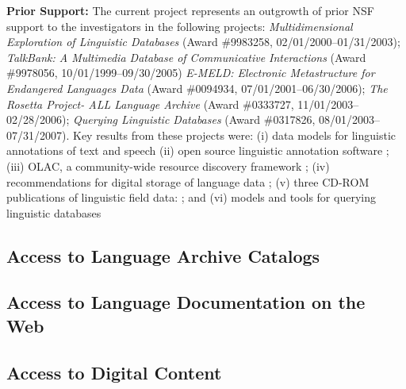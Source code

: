 \vspace{1in}

\textbf{Prior Support:} The current project represents an outgrowth of
prior NSF support to the investigators in the following projects:
\textit{Multidimensional Exploration of Linguistic Databases}
  (Award \#9983258, 02/01/2000--01/31/2003);
\textit{TalkBank: A Multimedia Database of Communicative Interactions}
  (Award \#9978056, 10/01/1999--09/30/2005)
\textit{E-MELD: Electronic Metastructure for Endangered Languages Data}
  (Award \#0094934, 07/01/2001--06/30/2006);
\textit{The Rosetta Project- ALL Language Archive}
  (Award \#0333727, 11/01/2003--02/28/2006);
\textit{Querying Linguistic Databases}
  (Award \#0317826, 08/01/2003--07/31/2007).
Key results from these projects were:
(i) data models for linguistic annotations of text and speech
\citep{BirdLiberman01,MaedaBird00,GraffBird00,CottonBird02,CieriBird01,ATLAS00,BirdHarrington01}
(ii) open source linguistic annotation software
\citep{Bird01acl,MaedaBird02,BirdMaeda02,MaLee02};
(iii) OLAC, a community-wide resource discovery framework
\citep{BirdSimons00,BirdSimons00survey,BirdSimons01,BirdSimons02workshop,Simons02query,SimonsBird03lht,BirdSimons03chum,Simons03display,SimonsBird03llc,BirdSimons04metadata};
(iv) recommendations for digital storage of language data
\citep{BirdSimons03language};
(v) three CD-ROM publications of linguistic field data:
\citep{BirdBell01,Bird03paradigms,Bird03ngomba};
and
(vi) models and tools for querying linguistic databases
\citep{BirdBuneman01,BirdBunemanTan00,LaiBird04,Bird05planx,Bird06icde}



\subsection{Access to Language Archive Catalogs}

\vspace{1in}

\subsection{Access to Language Documentation on the Web}

\vspace{1in}

\subsection{Access to Digital Content}

\vspace{1in}

